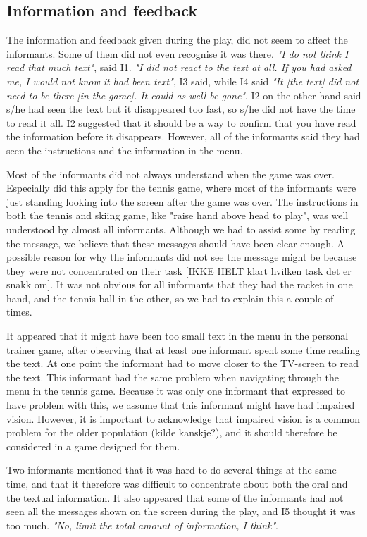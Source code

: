 \subsection{Information and feedback}
The information and feedback given during the play, did not seem to affect the informants. Some of them did not even recognise it was there. \emph{"I do not think I read that much text"}, said I1. \emph{"I did not react to the text at all. If you had asked me, I would not know it had been text"}, I3 said, while I4 said \emph{"It [the text] did not need to be there [in the game]. It could as well be gone"}. I2 on the other hand said s/he had seen the text but it disappeared too fast, so s/he did not have the time to read it all. I2 suggested that it should be a way to confirm that you have read the information before it disappears. However, all of the informants said they had seen the instructions and the information in the menu. 

Most of the informants did not always understand when the game was over. Especially did this apply for the tennis game, where most of the informants were just standing looking into the screen after the game was over.  The instructions in both the tennis and skiing game, like "raise hand above head to play", was well understood by almost all informants. Although we had to assist some by reading the message, we believe that these messages should have been clear enough. A possible reason for why the informants did not see the message might be because they were not concentrated on their task [IKKE HELT klart hvilken task det er snakk om]. It was not obvious for all informants that they had the racket in one hand, and the tennis ball in the other, so we had to explain this a couple of times. 

It appeared that it might have been too small text in the menu in the personal trainer game, after observing that at least one informant spent some time reading the text. At one point the informant had to move closer to the TV-screen to read the text. This informant had the same problem when navigating through the menu in the tennis game. Because it was only one informant that expressed to have problem with this, we assume that this informant might have had impaired vision. However, it is important to acknowledge that impaired vision is a common problem for the older population (kilde kanskje?), and it should therefore be considered in a game designed for them. 

Two informants mentioned that it was hard to do several things at the same time, and that it therefore was difficult to concentrate about both the oral and the textual information. It also appeared that some of the informants had not seen all the messages shown on the screen during the play, and I5 thought it was too much. \emph{"No, limit the total amount of information, I think"}. 


